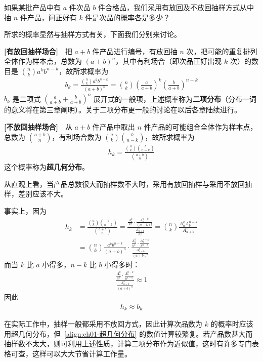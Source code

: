 \documentclass[../../main.tex]{subfiles}
\begin{document}
\begin{example}[二项分布与超几何分布]\label{example:ch01-二项与超几何}
如果某批产品中有 $a$ 件次品 $b$ 件合格品，我们采用有放回及不放回抽样方式从中抽 $n$ 件产品，问正好有 $k$ 件是次品的概率各是多少？

所求的概率显然与抽样方式有关，下面我们分别来讨论。

\textbf{[有放回抽样场合]}~~把 $a+b$ 件产品进行编号，有放回抽 $n$ 次，把可能的重复排列全体作为样本点，总数为 $(a+b)^n$，其中有利场合（即次品正好出现 $k$ 次）的数目是 $\binom{n}{k}a^k b^{n-k}$，故所求概率为
\begin{align}
b_k=\frac{\binom{n}{k}a^k b^{n-k}}{(a+b)^n}=\binom{n}{k}\left(\frac{a}{a+b}\right)^k\left(\frac{b}{a+b}\right)^{n-k}\label{align:ch01-二项分布}
\end{align}
$b_k$ 是二项式 $\left(\frac{a}{a+b}+\frac{b}{a+b}\right)^n$ 展开式的一般项，上述概率称为\textbf{二项分布}（分布一词的意义将在第三章阐明）。关于二项分布更一般的讨论在以后各章陆续进行。

\textbf{[不放回抽样场合]}~~从 $a+b$ 件产品中取出 $n$ 件产品的可能组合全体作为样本点，总数为 $\binom{a+b}{n}$，有利场合数为 $\binom{a}{k}\binom{b}{n-k}$，故所求概率为
\begin{align}
h_k=\frac{\binom{a}{k}\binom{b}{n-k}}{\binom{a+b}{n}}\label{align:ch01-超几何分布}
\end{align}
这个概率称为\textbf{超几何分布}。

从直观上看，当产品总数很大而抽样数不大时，采用有放回抽样与采用不放回抽样，差别应该不大。

事实上，因为
\begin{align*}
h_k&=\frac{\binom{a}{k}\binom{b}{n-k}}{\binom{a+b}{n}}=\frac{\frac{A_a^k}{k!}\cdot\frac{A_b^{n-k}}{(n-k)!}}{\frac{A_{a+b}^n}{n!}}=\binom{n}{k}\frac{A_a^k A_b^{n-k}}{A_{a+b}^n}\\
&=\binom{n}{k}\frac{a^k b^{n-k}}{(a+b)^n}\cdot\frac{\frac{A_a^k}{a^k}\cdot\frac{A_b^{n-k}}{b^{n-k}}}{\frac{A_{a+b}^n}{(a+b)^n}}
\end{align*}
而当 $k$ 比 $a$ 小得多，$n-k$ 比 $b$ 小得多时：
\begin{align*}
\frac{\frac{A_a^k}{a^k}\cdot\frac{A_b^{n-k}}{b^{n-k}}}{\frac{A_{a+b}^n}{(a+b)^n}}\approx 1
\end{align*}
因此
\begin{align*}
h_k\approx b_k
\end{align*}

在实际工作中，抽样一般都采用不放回方式，因此计算次品数为 $k$ 的概率时应该用超几何分布，但~\eqref{align:ch01-超几何分布} 的数值计算较繁复。若产品数甚大而抽样数不太大，则可利用上述性质，计算二项分布作为近似值，这时有许多专门表格可查，这样可以大大节省计算工作量。


\end{example}
\end{document}
